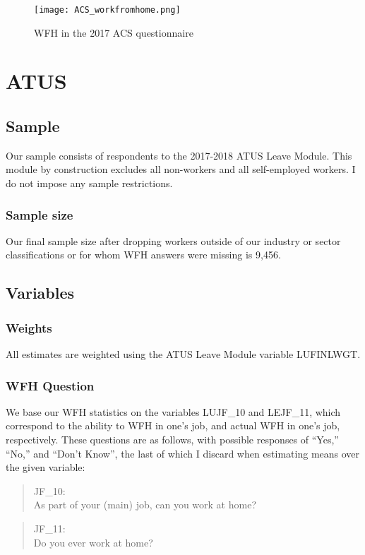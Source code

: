 \documentclass{article}
\begin{document}
\begin{figure}
\centering
\label{ACS-WFH}
\texttt{[image: ACS\_workfromhome.png]}
\caption{WFH in the 2017 ACS questionnaire}
\end{figure}

\section{ATUS}

\subsection{Sample}
Our sample consists of respondents to the 2017-2018 ATUS Leave Module. This module by construction excludes all non-workers and all self-employed workers. I do not impose any sample restrictions.

\subsubsection{Sample size}
Our final sample size after dropping workers outside of our industry or sector classifications or for whom WFH answers were missing is 9,456.

\subsection{Variables}

\subsubsection{Weights}
All estimates are weighted using the ATUS Leave Module variable LUFINLWGT.

\subsubsection{WFH Question}
We base our WFH statistics on the variables LUJF\_10 and LEJF\_11, which correspond to the ability to WFH in one's job, and actual WFH in one's job, respectively. These questions are as follows, with possible responses of ``Yes,'' ``No,'' and ``Don't Know'', the last of which I discard when estimating means over the given variable:
\begin{quote}
JF\_10: \\
As part of your (main) job, can you work at home?
\end{quote}
\begin{quote}
JF\_11: \\
Do you ever work at home?
\end{quote}
\end{document}
